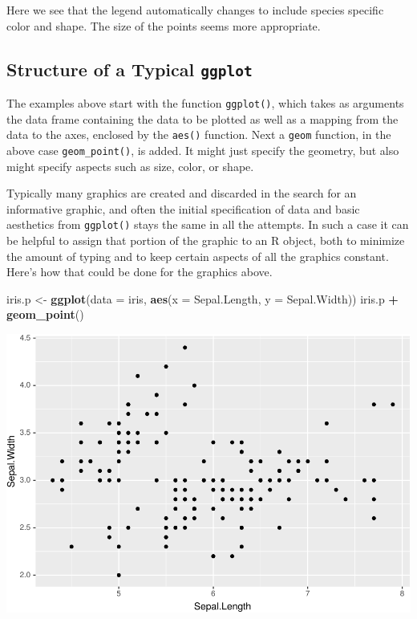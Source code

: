 \documentclass[]{krantz}
\makeatletter
\newenvironment{Shaded}{\begin{snugshade}}{\end{snugshade}}
\newcommand{\DataTypeTok}[1]{\textcolor[rgb]{0.27,0.27,0.27}{#1}}
\newcommand{\KeywordTok}[1]{\textcolor[rgb]{0.27,0.27,0.27}{\textbf{#1}}}
\newcommand{\NormalTok}[1]{#1}
\newcommand{\OperatorTok}[1]{\textcolor[rgb]{0.43,0.43,0.43}{\textbf{#1}}}
\newcommand{\StringTok}[1]{\textcolor[rgb]{0.5,0.5,0.5}{#1}}
\newenvironment{kframe}{%
\medskip{}
\setlength{\fboxsep}{.8em}
 \def\at@end@of@kframe{}%
 \ifinner\ifhmode%
  \def\at@end@of@kframe{\end{minipage}}%
  \begin{minipage}{\columnwidth}%
 \fi\fi%
 \def\FrameCommand##1{\hskip\@totalleftmargin \hskip-\fboxsep
 \colorbox{shadecolor}{##1}\hskip-\fboxsep
     \hskip-\linewidth \hskip-\@totalleftmargin \hskip\columnwidth}%
 \MakeFramed {\advance\hsize-\width
   \@totalleftmargin\z@ \linewidth\hsize
   \@setminipage}}%
 {\par\unskip\endMakeFramed%
 \at@end@of@kframe}
\renewenvironment{Shaded}{\begin{kframe}}{\end{kframe}}
\makeatother
\begin{document}
Here we see that the legend automatically changes to include species specific color and shape. The size of the points seems more appropriate.

\hypertarget{structure-of-a-typical-ggplot}{%
\subsection{\texorpdfstring{Structure of a Typical \texttt{ggplot}}{Structure of a Typical ggplot}}\label{structure-of-a-typical-ggplot}}

The examples above start with the function \texttt{ggplot()}, which takes as arguments the data frame containing the data to be plotted as well as a mapping from the data to the axes, enclosed by the \texttt{aes()} function. Next a \texttt{geom} function, in the above case \texttt{geom\_point()}, is added. It might just specify the geometry, but also might specify aspects such as size, color, or shape.

Typically many graphics are created and discarded in the search for an informative graphic, and often the initial specification of data and basic aesthetics from \texttt{ggplot()} stays the same in all the attempts. In such a case it can be helpful to assign that portion of the graphic to an R object, both to minimize the amount of typing and to keep certain aspects of all the graphics constant. Here's how that could be done for the graphics above.

\begin{Shaded}
\begin{Highlighting}[]
\NormalTok{iris.p <-}\StringTok{ }\KeywordTok{ggplot}\NormalTok{(}\DataTypeTok{data =}\NormalTok{ iris, }\KeywordTok{aes}\NormalTok{(}\DataTypeTok{x =}\NormalTok{ Sepal.Length, }\DataTypeTok{y =}\NormalTok{ Sepal.Width))}
\NormalTok{iris.p }\OperatorTok{+}\StringTok{ }\KeywordTok{geom_point}\NormalTok{()}
\end{Highlighting}
\end{Shaded}

\includegraphics{bookdown_files/figure-latex/unnamed-chunk-61-1.pdf}
\end{document}

